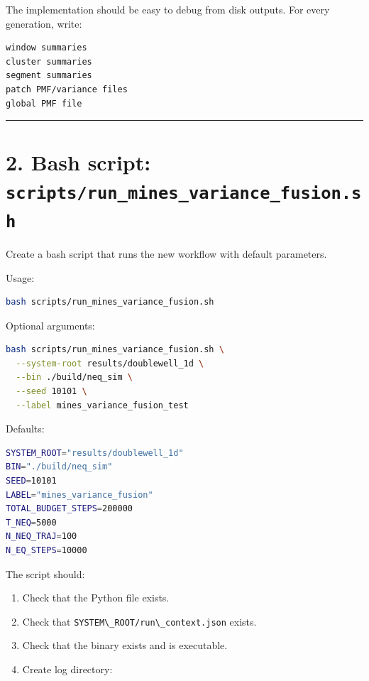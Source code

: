 \documentclass[
  10.5pt,
]{article}
\newcommand{\passthrough}[1]{#1}
\providecommand{\tightlist}{%
  \setlength{\itemsep}{0pt}\setlength{\parskip}{0pt}}
\begin{document}
The implementation should be easy to debug from disk outputs. For every
generation, write:

\begin{lstlisting}
window summaries
cluster summaries
segment summaries
patch PMF/variance files
global PMF file
\end{lstlisting}

\begin{center}\rule{0.5\linewidth}{0.5pt}\end{center}

\section{\texorpdfstring{2. Bash script:
\texttt{scripts/run\_mines\_variance\_fusion.sh}}{2. Bash script: scripts/run\_mines\_variance\_fusion.sh}}\label{bash-script-scriptsrun_mines_variance_fusion.sh}

Create a bash script that runs the new workflow with default parameters.

Usage:

\begin{lstlisting}[language=bash]
bash scripts/run_mines_variance_fusion.sh
\end{lstlisting}

Optional arguments:

\begin{lstlisting}[language=bash]
bash scripts/run_mines_variance_fusion.sh \
  --system-root results/doublewell_1d \
  --bin ./build/neq_sim \
  --seed 10101 \
  --label mines_variance_fusion_test
\end{lstlisting}

Defaults:

\begin{lstlisting}[language=bash]
SYSTEM_ROOT="results/doublewell_1d"
BIN="./build/neq_sim"
SEED=10101
LABEL="mines_variance_fusion"
TOTAL_BUDGET_STEPS=200000
T_NEQ=5000
N_NEQ_TRAJ=100
N_EQ_STEPS=10000
\end{lstlisting}

The script should:

\begin{enumerate}
\def\labelenumi{\arabic{enumi}.}
\tightlist
\item
  Check that the Python file exists.
\item
  Check that \passthrough{\lstinline!SYSTEM\_ROOT/run\_context.json!}
  exists.
\item
  Check that the binary exists and is executable.
\item
  Create log directory:
\end{enumerate}
\end{document}
